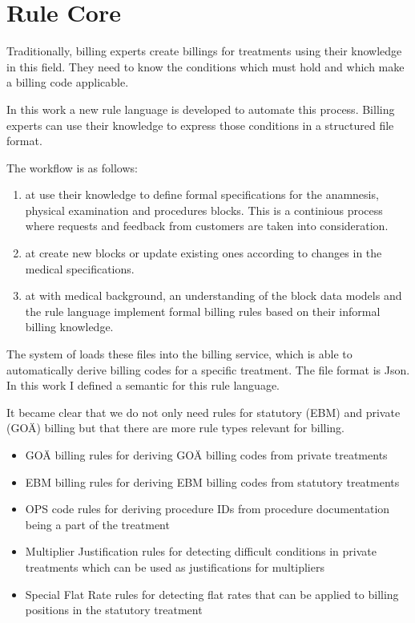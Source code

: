 \section{Rule Core}\label{sec:rule-core}

Traditionally, billing experts create billings for treatments using their knowledge in this field.
They need to know the conditions which must hold and which make a billing code applicable.

In this work a new rule language is developed to automate this process.
Billing experts can use their knowledge to express those conditions in a structured file format.



The workflow is as follows:
\begin{enumerate}
    \item \Me at \AV use their knowledge to define formal specifications for the anamnesis, physical examination and procedures blocks. This is a continious process where requests and feedback from customers are taken into consideration.
    \item \Se at \AV create new blocks or update existing ones according to changes in the medical specifications.
    \item \Be at \AV with medical background, an understanding of the block data models and the rule language implement formal billing rules based on their informal billing knowledge.
\end{enumerate}


The system of \AV loads these files into the billing service, which is able to automatically derive billing codes for a specific treatment.
The file format is Json.
In this work I defined a semantic for this rule language.

It became clear that we do not only need rules for statutory (EBM) and private (GOÄ) billing but that there are more rule types relevant for billing.

\begin{itemize}
    \item GOÄ billing rules for deriving GOÄ billing codes from private treatments
    \item EBM billing rules for deriving EBM billing codes from statutory treatments
    \item OPS code rules for deriving procedure IDs from procedure documentation being a part of the treatment
    \item Multiplier Justification rules for detecting difficult conditions in private treatments which can be used as justifications for multipliers
    \item Special Flat Rate rules for detecting flat rates that can be applied to billing positions in the statutory treatment
\end{itemize}

